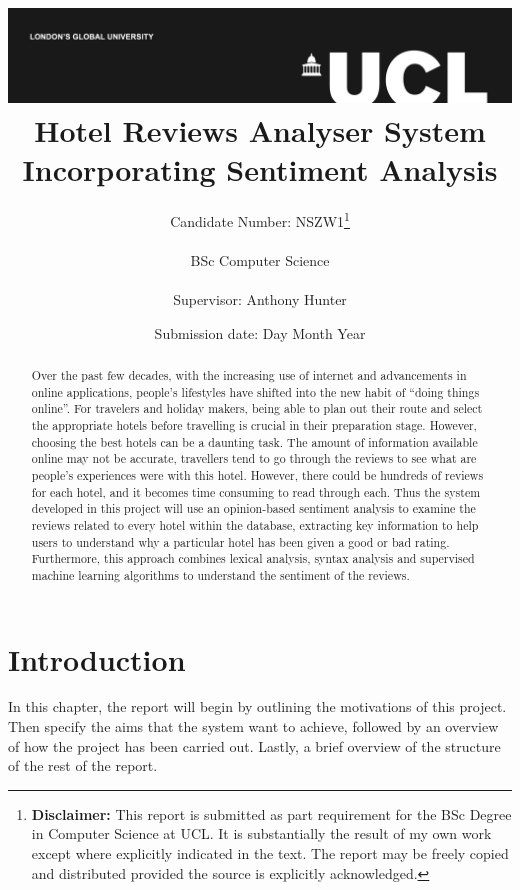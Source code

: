 \documentclass[a4paper]{report}
\title{{\vspace{-14em} \includegraphics[scale=0.4]{ucl_logo.png}}\\
{{\Huge Hotel Reviews Analyser System Incorporating Sentiment Analysis}}\\
}
\date{Submission date: Day Month Year}
\author{Candidate Number: NSZW1\thanks{
{\bf Disclaimer:}
This report is submitted as part requirement for the BSc Degree in Computer Science at UCL. It is
substantially the result of my own work except where explicitly indicated in the text. The report may be freely copied and distributed provided the source is explicitly acknowledged.}
\\ \\
BSc Computer Science\\ \\
Supervisor: Anthony Hunter}
\begin{document}
 
\onehalfspacing
\maketitle
\begin{abstract}
Over the past few decades, with the increasing use of internet and advancements in online applications, people’s lifestyles have shifted into the new habit of “doing things online”. For travelers and holiday makers, being able to plan out their route and select the appropriate hotels before travelling is crucial in their preparation stage. However, choosing the best hotels can be a daunting task. The amount of information available online may not be accurate, travellers tend to go through the reviews to see what are people's experiences were with this hotel. However, there could be hundreds of reviews for each hotel, and it becomes time consuming to read through each. Thus the system developed in this project will use an opinion-based sentiment analysis to examine the reviews related to every hotel within the database, extracting key information to help users to understand why a particular hotel has been given a good or bad rating. Furthermore, this approach combines lexical analysis, syntax analysis and supervised machine learning algorithms to understand the sentiment of the reviews.

\end{abstract}
\tableofcontents
\setcounter{page}{1}


\chapter{Introduction}
In this chapter, the report will begin by outlining the motivations of this project. Then specify the aims that the system want to achieve, followed by an overview of how the project has been carried out. Lastly, a brief overview of the structure of the rest of the report.
\end{document}
